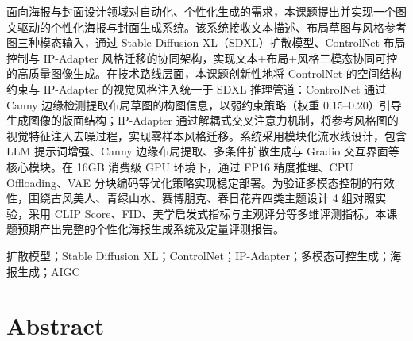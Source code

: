 \documentclass[10pt,a4paper]{article}
\begin{document}
面向海报与封面设计领域对自动化、个性化生成的需求，本课题提出并实现一个图文驱动的个性化海报与封面生成系统。该系统接收文本描述、布局草图与风格参考图三种模态输入，通过 Stable Diffusion XL（SDXL）扩散模型、ControlNet 布局控制与 IP-Adapter 风格迁移的协同架构，实现文本+布局+风格三模态协同可控的高质量图像生成。在技术路线层面，本课题创新性地将 ControlNet 的空间结构约束与 IP-Adapter 的视觉风格注入统一于 SDXL 推理管道：ControlNet 通过 Canny 边缘检测提取布局草图的构图信息，以弱约束策略（权重 0.15--0.20）引导生成图像的版面结构；IP-Adapter 通过解耦式交叉注意力机制，将参考风格图的视觉特征注入去噪过程，实现零样本风格迁移。系统采用模块化流水线设计，包含 LLM 提示词增强、Canny 边缘布局提取、多条件扩散生成与 Gradio 交互界面等核心模块。在 16GB 消费级 GPU 环境下，通过 FP16 精度推理、CPU Offloading、VAE 分块编码等优化策略实现稳定部署。为验证多模态控制的有效性，围绕古风美人、青绿山水、赛博朋克、春日花卉四类主题设计 4 组对照实验，采用 CLIP Score、FID、美学启发式指标与主观评分等多维评测指标。本课题预期产出完整的个性化海报生成系统及定量评测报告。

\vspace{8pt}
扩散模型；Stable Diffusion XL；ControlNet；IP-Adapter；多模态可控生成；海报生成；AIGC

\section*{\centering \Large Abstract}
\end{document}
